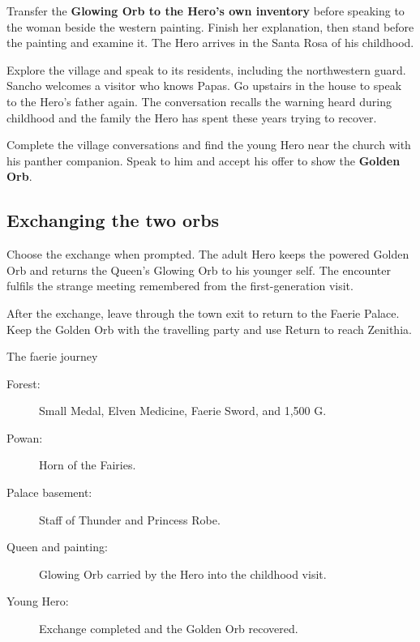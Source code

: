 Transfer the \textbf{Glowing Orb to the Hero's own inventory}
before speaking to the woman beside the western painting.
Finish her explanation, then stand before the painting and
examine it. The Hero arrives in the Santa Rosa of his childhood.

Explore the village and speak to its residents, including the
northwestern guard. Sancho welcomes a visitor who knows Papas.
Go upstairs in the house to speak to the Hero's father again.
The conversation recalls the warning heard during childhood
and the family the Hero has spent these years trying to recover.

Complete the village conversations and find the young Hero
near the church with his panther companion. Speak to him and
accept his offer to show the \textbf{Golden Orb}.

\subsection*{Exchanging the two orbs}

Choose the exchange when prompted. The adult Hero keeps the
powered Golden Orb and returns the Queen's Glowing Orb to
his younger self. The encounter fulfils the strange meeting
remembered from the first-generation visit.


After the exchange, leave through the town exit to return
to the Faerie Palace. Keep the Golden Orb with the travelling
party and use Return to reach Zenithia.

\begin{routecheck}{The faerie journey}
\begin{description}
  \item[Forest:] Small Medal, Elven Medicine, Faerie Sword, and 1,500 G.
  \item[Powan:] Horn of the Fairies.
  \item[Palace basement:] Staff of Thunder and Princess Robe.
  \item[Queen and painting:] Glowing Orb carried by the Hero
    into the childhood visit.
  \item[Young Hero:] Exchange completed and the Golden Orb recovered.
\end{description}
\end{routecheck}

